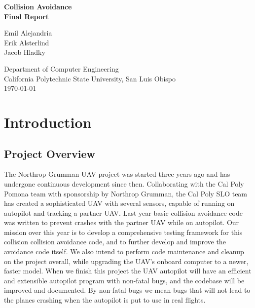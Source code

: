 \documentclass[12pt]{article}
\begin{document}
\begin{titlepage}
  \begin{center}
    \vspace*{1cm}
    \Huge{\textbf{
      Collision Avoidance\\
      Final Report
    }}

    \vfill
    \large{
      Emil Alejandria\\
      Erik Alsterlind\\
      Jacob Hladky\\
    }

    \vspace{1cm}

    \large{
      Department of Computer Engineering\\
      California Polytechnic State University, San Luis Obispo\\
      \today
    }

  \end{center}
\end{titlepage}


\section{Introduction}
\subsection{Project Overview}
	The Northrop Grumman UAV project was started three years ago and has undergone continuous development since then. Collaborating with the Cal Poly Pomona team with sponsorship by Northrop Grumman, the Cal Poly SLO team has created a sophisticated UAV with several sensors, capable of running on autopilot and tracking a partner UAV. Last year basic collision avoidance code was written to prevent crashes with the partner UAV while on autopilot. Our mission over this year is to develop a comprehensive testing framework for this collision collision avoidance code, and to further develop and improve the avoidance code itself. We also intend to perform code maintenance and cleanup on the project overall, while upgrading the UAV’s onboard computer to a newer, faster model.
When we finish this project the UAV autopilot will have an efficient and extensible autopilot program with non-fatal bugs, and the codebase will be improved and documented. By non-fatal bugs we mean bugs that will not lead to the planes crashing when the autopilot is put to use in real flights.
\end{document}
